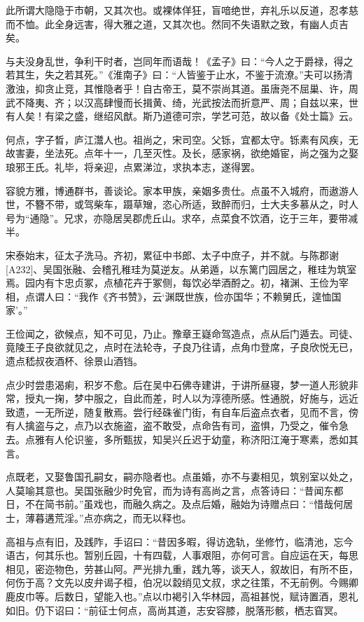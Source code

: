 \documentclass[12pt,UTF8]{ctexbook}
\begin{document}
此所谓大隐隐于市朝，又其次也。或裸体佯狂，盲喑绝世，弃礼乐以反道，忍孝慈而不恤。此全身远害，得大雅之道，又其次也。然同不失语默之致，有幽人贞吉矣。

与夫没身乱世，争利干时者，岂同年而语哉！《孟子》曰：“今人之于爵禄，得之若其生，失之若其死。”《淮南子》曰：“人皆鉴于止水，不鉴于流潦。”夫可以扬清激浊，抑贪止竞，其惟隐者乎！自古帝王，莫不崇尚其道。虽唐尧不屈巢、许，周武不降夷、齐；以汉高肆慢而长揖黄、绮，光武按法而折意严、周；自兹以来，世有人矣！有梁之盛，继绍风猷。斯乃道德可宗，学艺可范，故以备《处士篇》云。

何点，字子晳，庐江灊人也。祖尚之，宋司空。父铄，宜都太守。铄素有风疾，无故害妻，坐法死。点年十一，几至灭性。及长，感家祸，欲绝婚宦，尚之强为之娶琅邪王氏。礼毕，将亲迎，点累涕泣，求执本志，遂得罢。

容貌方雅，博通群书，善谈论。家本甲族，亲姻多贵仕。点虽不入城府，而遨游人世，不簪不带，或驾柴车，蹑草矰，恣心所适，致醉而归，士大夫多慕从之，时人号为“通隐”。兄求，亦隐居吴郡虎丘山。求卒，点菜食不饮酒，讫于三年，要带减半。

宋泰始末，征太子洗马。齐初，累征中书郎、太子中庶子，并不就。与陈郡谢[A232]、吴国张融、会稽孔稚珪为莫逆友。从弟遁，以东篱门园居之，稚珪为筑室焉。园内有卞忠贞冢，点植花卉于冢侧，每饮必举酒酹之。初，褚渊、王俭为宰相，点谓人曰：“我作《齐书赞》，云‘渊既世族，俭亦国华；不赖舅氏，遑恤国家’。”

王俭闻之，欲候点，知不可见，乃止。豫章王嶷命驾造点，点从后门遁去。司徒、竟陵王子良欲就见之，点时在法轮寺，子良乃往请，点角巾登席，子良欣悦无已，遗点嵇叔夜酒杯、徐景山酒铛。

点少时尝患渴痢，积岁不愈。后在吴中石佛寺建讲，于讲所昼寝，梦一道人形貌非常，授丸一掬，梦中服之，自此而差，时人以为淳德所感。性通脱，好施与，远近致遗，一无所逆，随复散焉。尝行经硃雀门街，有自车后盗点衣者，见而不言，傍有人擒盗与之，点乃以衣施盗，盗不敢受，点命告有司，盗惧，乃受之，催令急去。点雅有人伦识鉴，多所甄拔，知吴兴丘迟于幼童，称济阳江淹于寒素，悉如其言。

点既老，又娶鲁国孔嗣女，嗣亦隐者也。点虽婚，亦不与妻相见，筑别室以处之，人莫喻其意也。吴国张融少时免官，而为诗有高尚之言，点答诗曰：“昔闻东都日，不在简书前。”虽戏也，而融久病之。及点后婚，融始为诗赠点曰：“惜哉何居士，薄暮遘荒淫。”点亦病之，而无以释也。

高祖与点有旧，及践阼，手诏曰：“昔因多暇，得访逸轨，坐修竹，临清池，忘今语古，何其乐也。暂别丘园，十有四载，人事艰阻，亦何可言。自应运在天，每思相见，密迩物色，劳甚山阿。严光排九重，践九等，谈天人，叙故旧，有所不臣，何伤于高？文先以皮弁谒子桓，伯况以縠绡见文叔，求之往策，不无前例。今赐卿鹿皮巾等。后数日，望能入也。”点以巾褐引入华林园，高祖甚悦，赋诗置酒，恩礼如旧。仍下诏曰：“前征士何点，高尚其道，志安容膝，脱落形骸，栖志窅冥。
\end{document}
